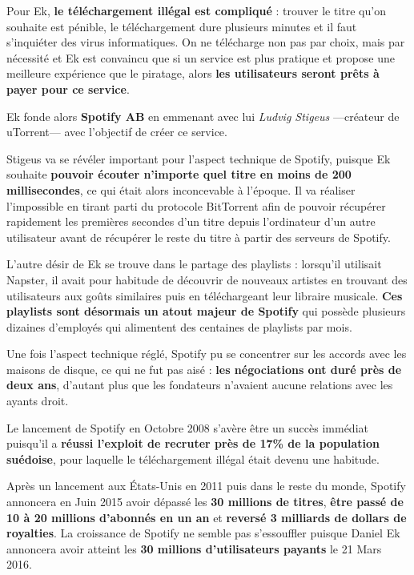 Pour Ek, \textbf{le téléchargement illégal est compliqué} : trouver le titre qu'on souhaite est pénible, le téléchargement dure plusieurs minutes et il faut s'inquiéter des virus informatiques. On ne télécharge non pas par choix, mais par nécessité et Ek est convaincu que si un service est plus pratique et propose une meilleure expérience que le piratage, alors \textbf{les utilisateurs seront prêts à payer pour ce service}.

\vspace{5mm}

Ek fonde alors \textbf{Spotify AB} en emmenant avec lui \textit{Ludvig Stigeus} ---créateur de uTorrent--- avec l'objectif de créer ce service.

Stigeus va se révéler important pour l'aspect technique de Spotify, puisque Ek souhaite \textbf{pouvoir écouter n'importe quel titre en moins de 200 millisecondes}, ce qui était alors inconcevable à l'époque. Il va réaliser l'impossible en tirant parti du protocole BitTorrent afin de pouvoir récupérer rapidement les premières secondes d'un titre depuis l'ordinateur d'un autre utilisateur avant de récupérer le reste du titre à partir des serveurs de Spotify.

L'autre désir de Ek se trouve dans le partage des playlists : lorsqu'il utilisait Napster, il avait pour habitude de découvrir de nouveaux artistes en trouvant des utilisateurs aux goûts similaires puis en téléchargeant leur libraire musicale. \textbf{Ces playlists sont désormais un atout majeur de Spotify} qui possède plusieurs dizaines d'employés qui alimentent des centaines de playlists par mois.

Une fois l'aspect technique réglé, Spotify pu se concentrer sur les accords avec les maisons de disque, ce qui ne fut pas aisé : \textbf{les négociations ont duré près de deux ans}, d'autant plus que les fondateurs n'avaient aucune relations avec les ayants droit.

\vspace{5mm}

Le lancement de Spotify en Octobre 2008 s'avère être un succès immédiat puisqu'il a \textbf{réussi l'exploit de recruter près de 17\% de la population suédoise}\supercite{IFPIDRM2010}, pour laquelle le téléchargement illégal était devenu une habitude.

Après un lancement aux États-Unis en 2011 puis dans le reste du monde, Spotify annoncera en Juin 2015 avoir dépassé les \textbf{30 millions de titres}\supercite{SpotifyPSMusic},  \textbf{être passé de 10 à 20 millions d'abonnés en un an} et \textbf{reversé 3 milliards de dollars de royalties}\supercite{Spotify20Million}. La croissance de Spotify ne semble pas s'essouffler puisque Daniel Ek annoncera avoir atteint les \textbf{30 millions d'utilisateurs payants} le 21 Mars 2016\supercite{Spotify30Million}.

